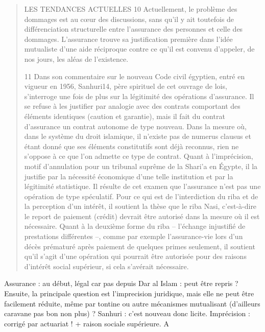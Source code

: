 \begin{quote}
LES TENDANCES ACTUELLES
10 Actuellement, le problème des dommages est au cœur des discussions, sans qu’il y ait toutefois de différenciation structurelle entre l’assurance des personnes et celle des dommages. L’assurance trouve sa justification première dans l’idée mutualiste d’une aide réciproque contre ce qu’il est convenu d’appeler, de nos jours, les aléas de l’existence.


11 Dans son commentaire sur le nouveau Code civil égyptien, entré en vigueur en 1956, Sanhuri14, père spirituel de cet ouvrage de lois, s’interroge une fois de plus sur la légitimité des opérations d’assurance. Il se refuse à les justifier par analogie avec des contrats comportant des éléments identiques (caution et garantie), mais il fait du contrat d’assurance un contrat autonome de type nouveau. Dans la mesure où, dans le système du droit islamique, il n’existe pas de numerus clausus et étant donné que ses éléments constitutifs sont déjà reconnus, rien ne s’oppose à ce que l’on admette ce type de contrat. Quant à l’imprécision, motif d’annulation pour un tribunal suprême de la Shari’a en Égypte, il la justifie par la nécessité économique d’une telle institution et par la légitimité statistique. Il résulte de cet examen que l’assurance n’est pas une opération de type spéculatif. Pour ce qui est de l’interdiction du riba et de la perception d’un intérêt, il soutient la thèse que le riba Nasi, c’est-à-dire le report de paiement (crédit) devrait être autorisé dans la mesure où il est nécessaire. Quant à la deuxième forme du riba – l’échange injustifié de prestations différentes –, comme par exemple l’assurance-vie lors d’un décès prématuré après paiement de quelques primes seulement, il soutient qu’il s’agit d’une opération qui pourrait être autorisée pour des raisons d’intérêt social supérieur, si cela s’avérait nécessaire.
\end{quote}
\begin{Synthesis}
Assurance : au début, légal car pas depuis Dar al Islam : peut être repris ?
Ensuite, la principale question est l'imprecision juridique, mais elle ne peut être facilement réduite, même par tontine ou autre mécanismes mutualisant (d'ailleurs caravane pas bon non plus) ?
Sanhuri : c'est nouveau donc licite. Imprécision : corrigé par actuariat ! + raison sociale supérieure. A
\end{Synthesis}

